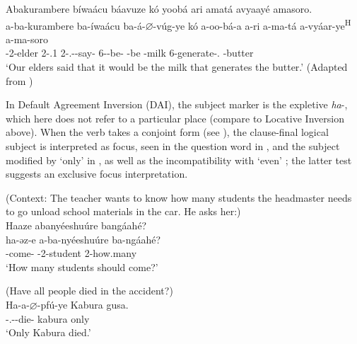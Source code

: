 \documentclass[output=paper]{langscibook}
\begin{document}
\ex
\begin{xlist}[SVOOOOO]
\label{bkm:Ref75348528:b}
Abakurambere bíwaácu báavuze kó yoobá ari amatá avyaayé amasoro.\\
\gll
a-ba-kurambere  ba-íwaácu  ba-á-$\varnothing$-vúg-ye  kó  a-oo-bá-a   a-ri  a-ma-tá  a-vyáar-ye\textsuperscript{H}  a-ma-soro \\
\AUG-{}2-elder  2-\POSS.1\PL{}  2\SM-\RMT.\PST-\CJ{}-say-\PFV{}  \COMP{}  6\SM-\POT{}-be-\FV{}   \EXP-{}be  -milk  6\SM-{}generate-\PFV.\REL{}  -butter \\
\glt
  ‘Our elders said that it would be the milk that generates the butter.’ (Adapted from )\\
\end{xlist}

\z
\z

In Default Agreement Inversion (DAI), the subject marker is the expletive \textit{ha}-, which here does not refer to a particular place (compare to Locative Inversion above). When the verb takes a conjoint form (see ), the clause-final logical subject is interpreted as focus, seen in the question word in , and the subject modified by ‘only’ in , as well as the incompatibility with ‘even’ ; the latter test suggests an exclusive focus interpretation.

\ea
\label{bkm:Ref73976476}
(Context: The teacher wants to know how many students the headmaster needs to go unload school materials in the car. He asks her:)\\
Haaze abanyéeshuúre bangáahé?\\
\gll
ha-əz-e  a-ba-nyéeshuúre  ba-ngáahé?\\
\EXP{}-come-\SBJV{}  \AUG{}-2-student  2-how.many\\
\glt
‘How many students should come?’\\

\z

\ea
\label{bkm:Ref75346884}
(Have all people died in the accident?)\\
\gll
Ha-a-$\varnothing$-pfú-ye  Kabura  gusa.\\
\EXP-\N.\PST-\CJ-{}die-\PFV{}  kabura  only\\
\glt
‘Only Kabura died.’\\
\end{document}
